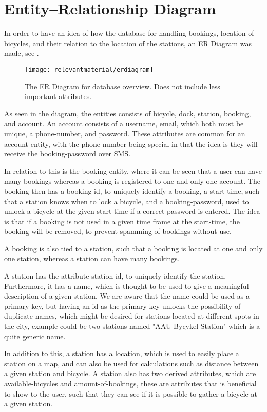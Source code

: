 \section{Entity--Relationship Diagram}
In order to have an idea of how the database for handling bookings, location of bicycles, and their relation to the location of the stations, an ER Diagram was made, see .

\begin{figure}
	\centering
	\texttt{[image: relevantmaterial/erdiagram]}
	\caption{The ER Diagram for database overview. Does not include less important attributes.}\label{fig:er-dia}
\end{figure}

As seen in the diagram, the entities consists of bicycle, dock, station, booking, and account.
An account consists of a username, email, which both must be unique, a phone-number, and password.
These attributes are common for an account entity, with the phone-number being special in that the idea is they will receive the booking-password over SMS.

In relation to this is the booking entity, where it can be seen that a user can have many bookings whereas a booking is registered to one and only one account.
The booking then has a booking-id, to uniquely identify a booking, a start-time, such that a station knows when to lock a bicycle, and a booking-password, used to unlock a bicycle at the given start-time if a correct password is entered.
The idea is that if a booking is not used in a given time frame at the start-time, the booking will be removed, to prevent spamming of bookings without use.

A booking is also tied to a station, such that a booking is located at one and only one station, whereas a station can have many bookings.

A station has the attribute station-id, to uniquely identify the station.
Furthermore, it has a name, which is thought to be used to give a meaningful description of a given station.
We are aware that the name could be used as a primary key, but having an id as the primary key unlocks the possibility of duplicate names, which might be desired for stations located at different spots in the city, example could be two stations named "AAU Bycykel Station" which is a quite generic name.

In addition to this, a station has a location, which is used to easily place a station on a map, and can also be used for calculations such as distance between a given station and bicycle.
A station also has two derived attributes, which are available-bicycles and amount-of-bookings, these are attributes that is beneficial to show to the user, such that they can see if it is possible to gather a bicycle at a given station.

